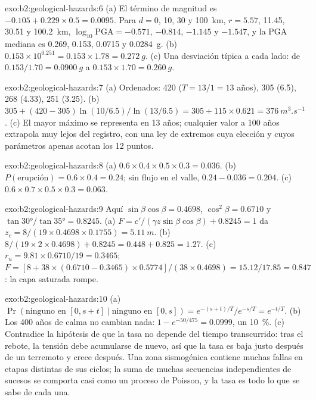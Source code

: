 \begin{solution}{exo:b2:geological-hazards:6}
(a) El término de magnitud es $-0.105 + 0.229 \times 0.5 = 0.0095$. Para $d = 0$, 10, 30 y
\qty{100}{km}, $r = 5.57$, 11.45, 30.51 y \qty{100.2}{km}, $\log_{10}\mathrm{PGA} = -0.571$,
$-0.814$, $-1.145$ y $-1.547$, y la PGA mediana es 0.269, 0.153, 0.0715 y \qty{0.0284}{g}.
(b) $0.153 \times 10^{0.251} = 0.153 \times 1.78 = \qty{0.272}{g}$. (c) Una desviación típica
a cada lado: de $0.153/1.70 = \qty{0.0900}{g}$ a $0.153 \times 1.70 = \qty{0.260}{g}$.
\end{solution}

\begin{solution}{exo:b2:geological-hazards:7}
(a) Ordenados: 420 ($T = 13/1 = 13$ años), 305 (6.5), 268 (4.33), 251 (3.25). (b) $305 + (420 -
305)\ln(10/6.5)/\ln(13/6.5) = 305 + 115 \times 0.621 = \qty{376}{m^3.s^{-1}}$. (c) El mayor máximo
se representa en 13 años; cualquier valor a 100 años extrapola muy lejos del registro, con una ley de
extremos cuya elección y cuyos parámetros apenas acotan los 12 puntos.
\end{solution}

\begin{solution}{exo:b2:geological-hazards:8}
(a) $0.6 \times 0.4 \times 0.5 \times 0.3 = 0.036$. (b) $P(\text{erupción}) = 0.6 \times 0.4 = 0.24$;
sin flujo en el valle, $0.24 - 0.036 = 0.204$. (c) $0.6 \times 0.7 \times 0.5 \times 0.3 =
0.063$.
\end{solution}

\begin{solution}{exo:b2:geological-hazards:9}
Aquí $\sin\beta\cos\beta = 0.4698$, $\cos^2\beta = 0.6710$ y $\tan\ang{30}/\tan\ang{35} =
0.8245$. (a) $F = c'/(\gamma z\sin\beta\cos\beta) + 0.8245 = 1$ da $z_c = 8/(19 \times 0.4698
\times 0.1755) = \qty{5.11}{m}$. (b) $8/(19 \times 2 \times 0.4698) + 0.8245 = 0.448 + 0.825 =
1.27$. (c) $r_u = 9.81 \times 0.6710/19 = 0.3465$; $F = [8 + 38 \times (0.6710 - 0.3465) \times
0.5774]/(38 \times 0.4698) = 15.12/17.85 = 0.847$: la capa saturada rompe.
\end{solution}

\begin{solution}{exo:b2:geological-hazards:10}
(a) $\Pr(\text{ninguno en } [0, s+t] \mid \text{ninguno en } [0, s]) = e^{-(s+t)/T}/e^{-s/T} = e^{-t/T}$.
(b) Los 400 años de calma no cambian nada: $1 - e^{-50/475} = 0.0999$, un \qty{10}{\percent}. (c)
Contradice la hipótesis de que la tasa no depende del tiempo transcurrido: tras el rebote, la
tensión debe acumularse de nuevo, así que la tasa es baja justo después de un terremoto y crece después. Una zona
sismogénica contiene muchas fallas en etapas distintas de sus ciclos; la suma de muchas secuencias independientes
de sucesos se comporta casi como un proceso de Poisson, y la tasa es todo lo que se sabe de cada una.
\end{solution}

